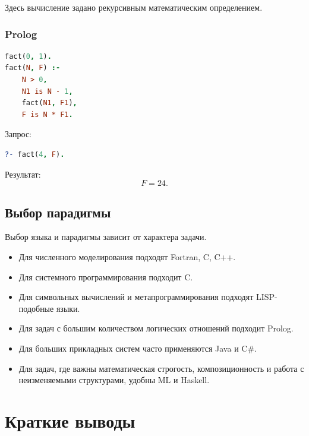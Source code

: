 \documentclass[12pt,a4paper]{article}
\begin{document}
Здесь вычисление задано рекурсивным математическим определением.

\subsubsection{Prolog}

\begin{lstlisting}[language=Prolog]
fact(0, 1).
fact(N, F) :-
    N > 0,
    N1 is N - 1,
    fact(N1, F1),
    F is N * F1.
\end{lstlisting}

Запрос:
\begin{lstlisting}[language=Prolog]
?- fact(4, F).
\end{lstlisting}

Результат:
\[
F = 24.
\]

\subsection{Выбор парадигмы}

Выбор языка и парадигмы зависит от характера задачи.

\begin{itemize}
    \item Для численного моделирования подходят Fortran, C, C++.
    \item Для системного программирования подходит C.
    \item Для символьных вычислений и метапрограммирования подходят LISP-подобные языки.
    \item Для задач с большим количеством логических отношений подходит Prolog.
    \item Для больших прикладных систем часто применяются Java и C\#.
    \item Для задач, где важны математическая строгость, композиционность и работа с неизменяемыми структурами, удобны ML и Haskell.
\end{itemize}

\section{Краткие выводы}
\end{document}
